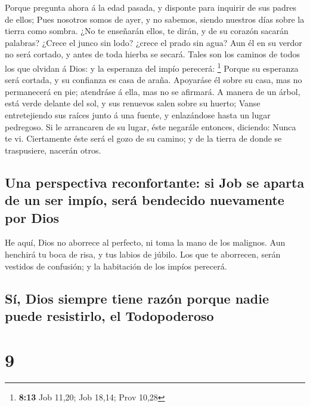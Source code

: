  Porque pregunta ahora á la edad pasada, y disponte para
inquirir de sus padres de ellos;  Pues nosotros somos de
ayer, y no sabemos, siendo nuestros días sobre la tierra como sombra.
 ¿No te enseñarán ellos, te dirán, y de su corazón
sacarán palabras?  ¿Crece el junco sin lodo? ¿crece el
prado sin agua?  Aun él en su verdor no será cortado, y
antes de toda hierba se secará.  Tales son los caminos de
todos los que olvidan á Dios: y la esperanza del impío perecerá:
\footnote{\textbf{8:13} Job 11,20; Job 18,14; Prov 10,28}
 Porque su esperanza será cortada, y su confianza es casa
de araña.  Apoyaráse él sobre su casa, mas no permanecerá
en pie; atendráse á ella, mas no se afirmará.  A manera
de un árbol, está verde delante del sol, y sus renuevos salen sobre su
huerto;  Vanse entretejiendo sus raíces junto á una
fuente, y enlazándose hasta un lugar pedregoso.  Si le
arrancaren de su lugar, éste negarále entonces, diciendo: Nunca te vi.
 Ciertamente éste será el gozo de su camino; y de la
tierra de donde se traspusiere, nacerán otros.

\hypertarget{una-perspectiva-reconfortante-si-job-se-aparta-de-un-ser-impuxedo-seruxe1-bendecido-nuevamente-por-dios}{%
\subsection{Una perspectiva reconfortante: si Job se aparta de un ser
impío, será bendecido nuevamente por
Dios}\label{una-perspectiva-reconfortante-si-job-se-aparta-de-un-ser-impuxedo-seruxe1-bendecido-nuevamente-por-dios}}

 He aquí, Dios no aborrece al perfecto, ni toma la mano
de los malignos.  Aun henchirá tu boca de risa, y tus
labios de júbilo.  Los que te aborrecen, serán vestidos
de confusión; y la habitación de los impíos perecerá.

\hypertarget{suxed-dios-siempre-tiene-razuxf3n-porque-nadie-puede-resistirlo-el-todopoderoso}{%
\subsection{Sí, Dios siempre tiene razón porque nadie puede resistirlo,
el
Todopoderoso}\label{suxed-dios-siempre-tiene-razuxf3n-porque-nadie-puede-resistirlo-el-todopoderoso}}

\hypertarget{section-8}{%
\section{9}\label{section-8}}

